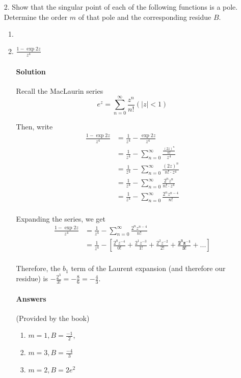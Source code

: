 \documentclass[]{article}
\begin{document}
\begin{enumerate}
	\item[2.] Show that the singular point of each of the following functions is a pole. Determine the order $m$ of that pole and the corresponding residue $B$.
	
	\begin{enumerate}
		\item
		\item $\frac{1 - \exp{2z}}{z^4}$
		
	\paragraph{Solution}
	Recall the MacLaurin series
	\[e^z = \sum^{\infty}_{n=0} \frac{z^n}{n!} (|z| < 1) \]
	
	Then, write
	\[\begin{aligned}
		\frac{1 - \exp{2z}}{z^4}
		&= \frac{1}{z^4} - \frac{\exp{2z}}{z^4} \\
		&= \frac{1}{z^4} - \sum^{\infty}_{n=0} \frac{\frac{(2z)^n}{n!}}{z^4} \\
		&= \frac{1}{z^4} - \sum^{\infty}_{n=0} \frac{(2z)^n}{n! \cdot z^4} \\
		&= \frac{1}{z^4} - \sum^{\infty}_{n=0} \frac{2^n z^n}{n! \cdot z^4} \\
		&= \frac{1}{z^4} - \sum^{\infty}_{n=0} \frac{2^n z^{ n - 4 }}{n!} \\
	\end{aligned}\]
	
	Expanding the series, we get
	\[\begin{aligned}
		\frac{1 - \exp{2z}}{z^4}
		&= \frac{1}{z^4} - \sum^{\infty}_{n=0} \frac{2^n z^{ n - 4 }}{n!} \\
		&= \frac{1}{z^4} - [ \frac{2^0z^{-4}}{0!} + \frac{{2^1}z^{-3}}{1!}
			+ \frac{2^2z^{-2}}{2!} + \mathbf{ \frac{2^3 z^{-1}}{3!} } + ... ] \\	
	\end{aligned}\]
	
	Therefore, the $b_1$ term of the Laurent expansion (and therefore our residue) is
	$-\frac{2^3}{3!} = -\frac{8}{6} = -\frac{4}{3}$.
		
	\paragraph{Answers}
	(Provided by the book)
	\begin{enumerate}
		\item $m = 1, B = \frac{-1}{2}$,
		\item $m = 3, B = \frac{-4}{3}$
		\item $m = 2, B = 2e^2$
	\end{enumerate}
		
	\end{enumerate}
\end{enumerate}
\end{document}
